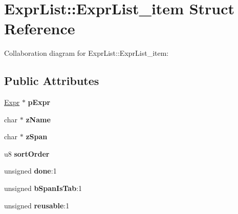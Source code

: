 \hypertarget{structExprList_1_1ExprList__item}{}\section{Expr\+List\+:\+:Expr\+List\+\_\+item Struct Reference}
\label{structExprList_1_1ExprList__item}


Collaboration diagram for Expr\+List\+:\+:Expr\+List\+\_\+item\+:
\subsection*{Public Attributes}
\begin{DoxyCompactItemize}
\item 
\hyperlink{structExpr}{Expr} $\ast$ {\bfseries p\+Expr}\hypertarget{structExprList_1_1ExprList__item_a75906cf3ff19e5bf16373fec7f3c79ad}{}\label{structExprList_1_1ExprList__item_a75906cf3ff19e5bf16373fec7f3c79ad}

\item 
char $\ast$ {\bfseries z\+Name}\hypertarget{structExprList_1_1ExprList__item_af278eb03a1169c73d144547adaf9b04f}{}\label{structExprList_1_1ExprList__item_af278eb03a1169c73d144547adaf9b04f}

\item 
char $\ast$ {\bfseries z\+Span}\hypertarget{structExprList_1_1ExprList__item_ade485bb6fafb44ec2aba59d05b8d117b}{}\label{structExprList_1_1ExprList__item_ade485bb6fafb44ec2aba59d05b8d117b}

\item 
u8 {\bfseries sort\+Order}\hypertarget{structExprList_1_1ExprList__item_af9084dc073f96792c0c7a8a894778881}{}\label{structExprList_1_1ExprList__item_af9084dc073f96792c0c7a8a894778881}

\item 
unsigned {\bfseries done}\+:1\hypertarget{structExprList_1_1ExprList__item_a0100abfbd214ec2199dd25e4bce05dcb}{}\label{structExprList_1_1ExprList__item_a0100abfbd214ec2199dd25e4bce05dcb}

\item 
unsigned {\bfseries b\+Span\+Is\+Tab}\+:1\hypertarget{structExprList_1_1ExprList__item_a05e84a6dbbf69cea042d3bf888955999}{}\label{structExprList_1_1ExprList__item_a05e84a6dbbf69cea042d3bf888955999}

\item 
unsigned {\bfseries reusable}\+:1\hypertarget{structExprList_1_1ExprList__item_a066f924fb690e78cd2833770f737a13b}{}\label{structExprList_1_1ExprList__item_a066f924fb690e78cd2833770f737a13b}


\end{DoxyCompactItemize}
